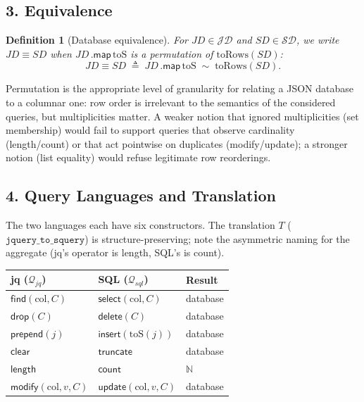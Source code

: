 \documentclass{article}
\newtheorem{definition}{Definition}
\begin{document}
\subsection*{3. Equivalence}

\begin{definition}[Database equivalence]
\label{def:equiv}
For $JD \in \mathcal{JD}$ and $SD \in \mathcal{SD}$, we write $JD \equiv SD$ when $JD\,\textsf{.map}\,\mathrm{toS}$ is a permutation of $\mathrm{toRows}(SD)$:
\[
JD \equiv SD \;\triangleq\; JD\,\textsf{.map}\,\mathrm{toS} \;\sim\; \mathrm{toRows}(SD).
\]
\end{definition}

Permutation is the appropriate level of granularity for relating a JSON database to a columnar one: row order is irrelevant to the semantics of the considered queries, but multiplicities matter. A weaker notion that ignored multiplicities (set membership) would fail to support queries that observe cardinality (\textsf{length}/\textsf{count}) or that act pointwise on duplicates (\textsf{modify}/\textsf{update}); a stronger notion (list equality) would refuse legitimate row reorderings.

\subsection*{4. Query Languages and Translation}

The two languages each have six constructors. The translation $T$ ($\texttt{jquery\_to\_squery}$) is structure-preserving; note the asymmetric naming for the aggregate (jq's operator is \textsf{length}, SQL's is \textsf{count}).

\begin{center}
\begin{tabular}{lll}
\hline
jq ($\mathcal{Q}_{jq}$) & SQL ($\mathcal{Q}_{sql}$) & Result \\
\hline
$\mathsf{find}(\mathrm{col}, C)$       & $\mathsf{select}(\mathrm{col}, C)$       & database \\
$\mathsf{drop}(C)$                     & $\mathsf{delete}(C)$                     & database \\
$\mathsf{prepend}(j)$                  & $\mathsf{insert}(\mathrm{toS}(j))$       & database \\
$\mathsf{clear}$                       & $\mathsf{truncate}$                      & database \\
$\mathsf{length}$                      & $\mathsf{count}$                         & $\mathbb{N}$ \\
$\mathsf{modify}(\mathrm{col}, v, C)$  & $\mathsf{update}(\mathrm{col}, v, C)$    & database \\
\hline
\end{tabular}
\end{center}
\end{document}
